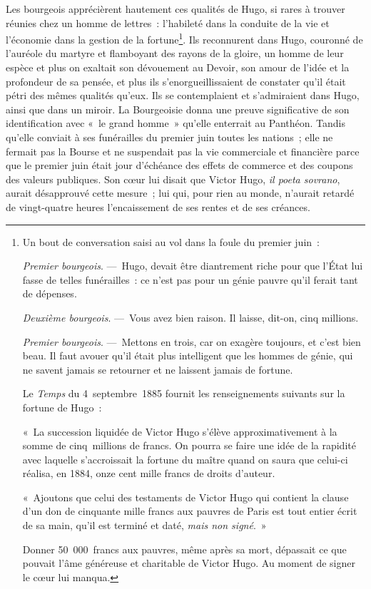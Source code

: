 \documentclass[french,twoside]{book} %
\begin{document}
Les bourgeois apprécièrent hautement ces qualités de Hugo, si rares à trouver réunies chez un homme de lettres : l’habileté dans la conduite de la vie et l’économie dans la gestion de la fortune\footnote{\noindent Un bout de conversation saisi au vol dans la foule du premier juin :\par
{\itshape Premier bourgeois}. — Hugo, devait être diantrement riche pour que l’État lui fasse de telles funérailles : ce n’est pas pour un génie pauvre qu’il ferait tant de dépenses.\par
{\itshape Deuxième bourgeois}. — Vous avez bien raison. Il laisse, dit-on, cinq millions.\par
{\itshape Premier bourgeois}. — Mettons en trois, car on exagère toujours, et c’est bien beau. Il faut avouer qu’il était plus intelligent que les hommes de génie, qui ne savent jamais se retourner et ne laissent jamais de fortune.\par
Le \emph{Temps} du 4 septembre 1885 fournit les renseignements suivants sur la fortune de Hugo :\par
\noindent « La succession liquidée de Victor Hugo s’élève approximativement à la somme de cinq millions de francs. On pourra se faire une idée de la rapidité avec laquelle s’accroissait la fortune du maître quand on saura que celui-ci réalisa, en 1884, onze cent mille francs de droits d’auteur.\par
« Ajoutons que celui des testaments de Victor Hugo qui contient la clause d’un don de cinquante mille francs aux pauvres de Paris est tout entier écrit de sa main, qu’il est terminé et daté, {\itshape mais non signé}. »
\par
\noindent Donner 50 000 francs aux pauvres, même après sa mort, dépassait ce que pouvait l’âme généreuse et charitable de Victor Hugo. Au moment de signer le cœur lui manqua.
}. Ils reconnurent dans Hugo, couronné de l’auréole du martyre et flamboyant des rayons de la gloire, un homme de leur espèce et plus on exaltait son dévouement au Devoir, son amour de l’idée et la profondeur de sa pensée, et plus ils s’enorgueillissaient de constater qu’il était pétri des mêmes qualités qu’eux. Ils se  
\label{p58}contemplaient et s’admiraient dans Hugo, ainsi que dans un miroir. La Bourgeoisie donna une preuve significative de son identification avec « le grand homme » qu’elle enterrait au Panthéon. Tandis qu’elle conviait à ses funérailles du premier juin toutes les nations ; elle ne fermait pas la Bourse et ne suspendait pas la vie commerciale et financière parce que le premier juin était jour d’échéance des effets de commerce et des coupons des valeurs publiques. Son cœur lui disait que Victor Hugo, {\itshape il poeta sovrano}, aurait désapprouvé cette mesure ; lui qui, pour rien au monde, n’aurait retardé de vingt-quatre heures l’encaissement de ses rentes et de ses créances.
 
\end{document}
